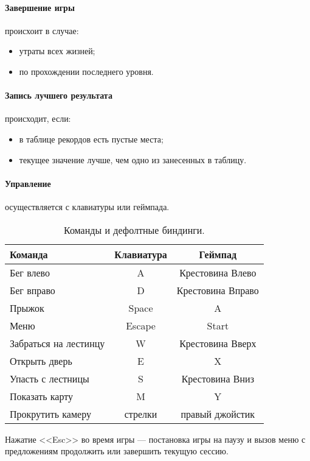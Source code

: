 \documentclass[12pt,a4paper,fullpage,titlepage]{article}
\begin{document}
\paragraph{Завершение игры} происхоит в случае:
\begin{itemize}
	\item утраты всех жизней;
	\item по прохождении последнего уровня.
\end{itemize}

\paragraph{Запись лучшего результата} происходит, если:
\begin{itemize}
	\item в таблице рекордов есть пустые места;
	\item текущее значение лучше, чем одно из занесенных в таблицу.
\end{itemize}

\paragraph{Управление} осуществляется с клавиатуры или геймпада.\\
\begin{table}[h]
\begin{tabularx}{\textwidth}{|X|c|c|}
	\hline
	Команда & Клавиатура & Геймпад\\
	\hline
	Бег влево & A & Крестовина Влево \\
	\hline
	Бег вправо & D & Крестовина Вправо \\
	\hline
	Прыжок & Space & A \\
	\hline
	Меню & Escape & Start \\
	\hline
	Забраться на лестинцу & W & Крестовина Вверх \\
	\hline
	Открыть дверь & E & X \\
	\hline
	Упасть с лестницы & S & Крестовина Вниз \\
	\hline
	Показать карту & M & Y \\
	\hline
	Прокрутить камеру & стрелки & правый джойстик \\
	\hline
\end{tabularx}
\caption{Команды и дефолтные биндинги.}
\end{table}

Нажатие <<Esc>> во время игры --- постановка игры на паузу и вызов меню с предложениям продолжить или завершить текущую сессию.\\
\end{document}
